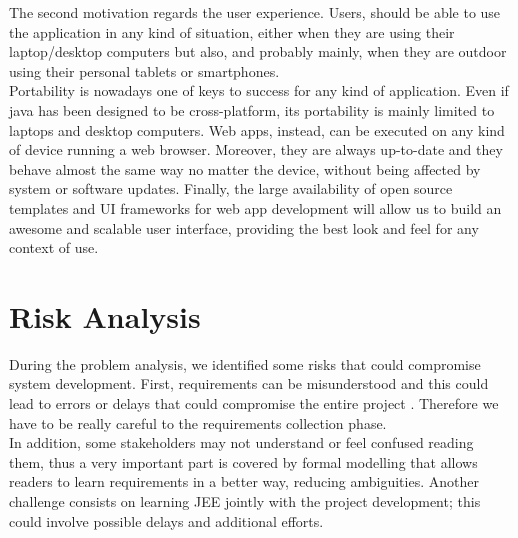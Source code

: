 \documentclass[12pt]{book}
\begin{document}
	The second motivation regards the user experience. Users, should be able to use the application in any kind of situation, either when they are using their laptop/desktop computers but also, and probably mainly,  when they are outdoor using their personal tablets or smartphones.\\
Portability is nowadays one of keys to success for any kind of application. Even if java has been designed to be cross-platform, its portability is mainly limited to laptops and desktop computers. Web apps, instead, can be executed on any kind of device running a web browser. Moreover, they are always up-to-date and they behave almost the same way no matter the device, without being affected by system or software updates. Finally,  the large availability of open source templates and UI frameworks for web app development will allow us to build an awesome and scalable user interface, providing the best look and feel for any context of use.\\

\section{Risk Analysis}
During the problem analysis, we identified some risks that could compromise system development. 
First, requirements can be misunderstood and this could lead to errors or delays that could compromise the entire project . Therefore we have to be really careful to the requirements collection phase. \\ In addition, some stakeholders may not understand or feel confused reading them, thus a very important part is covered by formal modelling that allows readers to learn requirements in a better way, reducing ambiguities.
Another challenge consists on learning JEE jointly with the project development;  this could involve possible delays and additional efforts. \\
\end{document}
